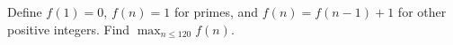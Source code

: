 Define $f(1)=0$, $f(n)=1$ for primes, and $f(n)=f(n-1)+1$ for other positive integers. Find $\max_{n\le120}f(n)$.

